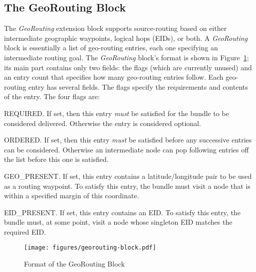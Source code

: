 \subsection{The GeoRouting Block}
\begin{sloppypar}
The {\em GeoRouting} extension block supports source-routing based on either intermediate geographic waypoints, logical hops (EIDs), or both.  A {\em GeoRouting} block is essentially a list of geo-routing entries, each one specifying an intermediate routing goal. The {\em GeoRouting} block's format is shown in Figure~\ref{fig:georouting-block}; its main part contains only two fields: the flags (which are currently unused) and an entry count that specifies how many geo-routing entries follow.  Each geo-routing entry has several fields.  The flags specify the requirements and contents of the entry. The four flags are:
\begin{description*}
  \item[REQUIRED.] If set, then this entry {\it must} be satisfied for the bundle to be considered delivered.  Otherwise the entry is considered optional.
  \item[ORDERED.] If set, then this entry {\it must} be satisfied before any successive entries can be considered.  Otherwise an intermediate node can pop following entries off the list before this one is satisfied.
  \item[GEO\_PRESENT.] If set, this entry contains a latitude/longitude pair to be used as a routing waypoint.  To satisfy this entry, the bundle must visit a node that is within a specified margin of this coordinate.
  \item[EID\_PRESENT.] If set, this entry contains an EID.  To satisfy this entry, the bundle must, at some point, visit a node whose singleton EID matches the required EID.
\end{description*}
\end{sloppypar}

\begin{figure}
\begin{center}
\texttt{[image: figures/georouting-block.pdf]}
\end{center}
\vspace{-.75cm}
\caption{Format of the GeoRouting Block}
\label{fig:georouting-block}
\vspace{-.5cm}
\end{figure}

